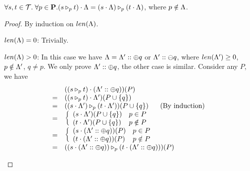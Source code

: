 {{{\iftrue
\begin{lemma}\label{lem:tracemerge}
$\forall s,t\in\Tcal.\; \forall p\in\PS.  (\omerge{p}{s}{t})\cdot \trace = \omerge{p}{(s\cdot\trace)}{(t\cdot\trace)} $, where $p\notin \trace$.
\end{lemma}
\begin{proof}
By induction on $\tlength{\trace}$.
\begin{ProofEnumDesc}
\item[$\tlength{\trace} = 0$:] Trivially.
\item[$\tlength{\trace} > 0$:] In this case we have $\trace = \trace'::\tplus{q}$ or $\trace'::\tminus{q}$, where $\tlength{\trace'} \geq 0$, $p\notin \trace' $, $q\neq p$. We only prove $\trace'::\tplus{q}$, the other case is similar. Consider any $P$, we have
$$
\begin{array}{rlll}
&&((\omerge{p}{s}{t})\cdot (\trace'::\tplus{q}))(P)&\\
&= & ((\omerge{p}{s}{t})\cdot\trace')(P\cup\{q\}) & \\
 &= & (\omerge{p}{(s\cdot\trace')}{(t\cdot\trace')})(P\cup\{q\})~~~~~(\textrm{By induction}) & \\
& = & \left \{ \begin{array}{ll} (s\cdot\trace')(P\cup \{q\})  & p\in P \\ (t\cdot\trace')(P\cup \{q\})  & p\notin P \end{array} \right.&\\
& = & \left \{ \begin{array}{ll} (s\cdot(\trace'::\tplus{q}))(P)  & p\in P \\ (t\cdot(\trace'::\tplus{q}))(P)  & p\notin P \end{array} \right.&\\
&= & (\omerge{p}{(s\cdot(\trace'::\tplus{q}))}{(t\cdot(\trace'::\tplus{q}))})(P) &\\
\end{array}
$$
\end{ProofEnumDesc}
\end{proof}


}}}
